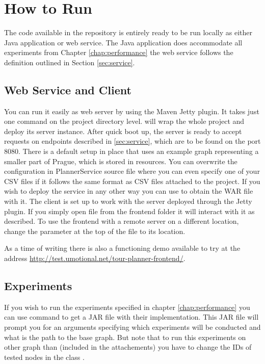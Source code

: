 \documentclass{ctuthesis}
\begin{document}
\section{How to Run}
The code available in the repository is entirely ready to be run locally as either Java application or web service. The Java application does accommodate all experiments from Chapter \ref{chap:performance} the web service follows the definition outlined in Section \ref{sec:service}. \par

\subsection{Web Service and Client}
You can run it easily as web server by using the Maven Jetty plugin. It takes just one command on the project directory level.  will wrap the whole project and deploy its server instance. After quick boot up, the server is ready to accept requests on endpoints described in \ref{sec:service}, which are to be found on the port 8080. There is a default setup in place that uses an example graph representing a smaller part of Prague, which is stored in resources. You can overwrite the configuration in PlannerService source file where you can even specify one of your CSV files if it follows the same format as CSV files attached to the project. If you wish to deploy the service in any other way you can use  to obtain the WAR file with it.
The client is set up to work with the server deployed through the Jetty plugin. If you simply open  file from the frontend folder it will interact with it as described. To use the frontend with a remote server on a different location, change the  parameter at the top of the  file to its location. \par
As a time of writing there is also a functioning demo available to try at the address \url{http://test.umotional.net/tour-planner-frontend/}.
\subsection{Experiments}
If you wish to run the experiments specified in chapter \ref{chap:performance} you can use command  to get a JAR file with their implementation. This JAR file will prompt you for an arguments specifying which experiments will be conducted and what is the path to the base graph. But note that to run this experiments on other graph than (included in the attachements) you have to change the IDs of tested nodes in the class . \par
\end{document}
